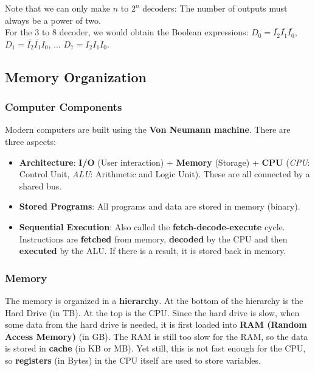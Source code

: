 \documentclass[]{article}
\begin{document}
Note that we can only make $n$ to $2^n$ decoders: The number of outputs must always be a power of two.\\

For the 3 to 8 decoder, we would obtain the Boolean expressions: $D_0 = \bar{I_2}\bar{I_1}\bar{I_0}$, $D_1 = \bar{I_2}\bar{I_1}I_0$, ... $D_7 = I_2I_1I_0$.\\

\subsection{Memory Organization}
\bigbreak
\subsubsection{Computer Components}
\bigbreak

Modern computers are built using the \textbf{Von Neumann machine}. There are three aspects:

\begin{itemize}
	\item \textbf{Architecture}: \textbf{I/O} (User interaction) + \textbf{Memory} (Storage) + \textbf{CPU} (\textit{CPU}: Control Unit, \textit{ALU}: Arithmetic and Logic Unit). These are all connected by a shared bus.
	\item \textbf{Stored Programs}: All programs and data are stored in memory (binary).
	\item \textbf{Sequential Execution}: Also called the \textbf{fetch-decode-execute} cycle. Instructions are \textbf{fetched} from memory, \textbf{decoded} by the CPU and then \textbf{executed} by the ALU. If there is a result, it is stored back in memory. \smallskip
\end{itemize}

\subsubsection{Memory}
\bigbreak

The memory is organized in a \textbf{hierarchy}. At the bottom of the hierarchy is the Hard Drive (in TB). At the top is the CPU. Since the hard drive is slow, when some data from the hard drive is needed, it is first loaded into \textbf{RAM (Random Access Memory)} (in GB). The RAM is still too slow for the RAM, so the data is stored in \textbf{cache} (in KB or MB). Yet still, this is not fast enough for the CPU, so \textbf{registers} (in Bytes) in the CPU itself are used to store variables.
\end{document}
